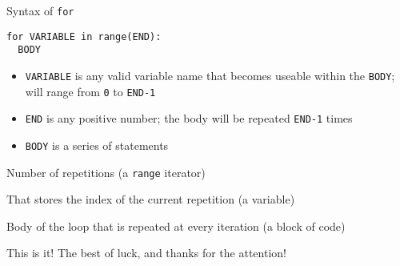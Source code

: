 \documentclass{beamer}
\begin{document}
\begin{frame}[fragile]{Syntax of \texttt{for}}
\begin{lstlisting}
for VARIABLE in range(END):
  BODY
\end{lstlisting}

\begin{itemize}
\item \texttt{VARIABLE} is any valid variable name that becomes useable within the \texttt{BODY}; will range from \texttt{0} to \texttt{END-1}
\item \texttt{END} is any positive number; the body will be repeated \texttt{END-1} times
\item \texttt{BODY} is a series of statements
\end{itemize}
\end{frame}




\begin{slide}{
\item Number of repetitions (a \texttt{range} iterator)
\item That stores the index of the current repetition (a variable)
\item Body of the loop that is repeated at every iteration (a block of code)
}\end{slide}


\begin{frame}{This is it!}
\center
\fontsize{18pt}{7.2}\selectfont
The best of luck, and thanks for the attention!
\end{frame}
\end{document}
